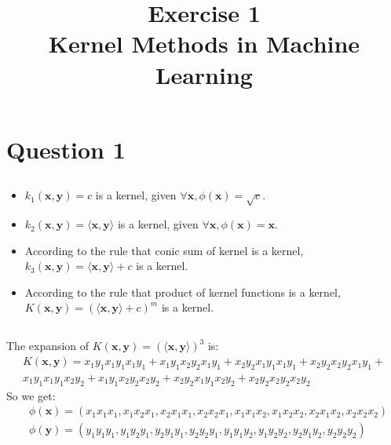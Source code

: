 \documentclass[a4paper, 11pt]{article}
\begin{document}
\title{Exercise 1\\{\Large Kernel Methods in Machine Learning}}
\maketitle
\section{Question 1}
\subsection{}
\begin{itemize}
\item $k_1(\mathbf{x}, \mathbf{y})=c$ is a kernel, given $\forall \mathbf{x}, \phi(\mathbf{x})=\sqrt{c}$.
\item $k_2(\mathbf{x}, \mathbf{y})=\langle\mathbf{x}, \mathbf{y}\rangle$ is a kernel, given $\forall \mathbf{x}, \phi(\mathbf{x})=\mathbf{x}$.
\item According to the rule that conic sum of kernel is a kernel, $k_3(\mathbf{x}, \mathbf{y})=\langle\mathbf{x}, \mathbf{y}\rangle+c$ is a kernel.
\item According to the rule that product of kernel functions is a kernel, $K(\mathbf{x},\mathbf{y})=(\langle\mathbf{x}, \mathbf{y}\rangle+c)^m$ is a kernel.
\end{itemize}
\subsection{}
The expansion of $K(\mathbf{x}, \mathbf{y}) =( \langle \mathbf{x}, \mathbf{y} \rangle)^3$ is:\\
\begin{align*}
K(\mathbf{x}, \mathbf{y})  = x_1y_1x_1y_1x_1y_1+x_1y_1x_2y_2x_1y_1+x_2y_2x_1y_1x_1y_1+
x_2y_2x_2y_2x_1y_1+\\x_1y_1x_1y_1x_2y_2+x_1y_1x_2y_2x_2y_2+
x_2y_2x_1y_1x_2y_2+x_2y_2x_2y_2x_2y_2
\end{align*}
So we get:
\begin{align*}
&\phi(\mathbf{x}) = (x_1x_1x_1,x_1x_2x_1,x_2x_1x_1,x_2x_2x_1,x_1x_1x_2,x_1x_2x_2,x_2x_1x_2,x_2x_2x_2)\\
&\phi(\mathbf{y}) = (y_1y_1y_1,y_1y_2y_1,y_2y_1y_1,y_2y_2y_1,y_1y_1y_2,y_1y_2y_2,y_2y_1y_2,y_2y_2y_2)\\
\end{align*}
\end{document}
